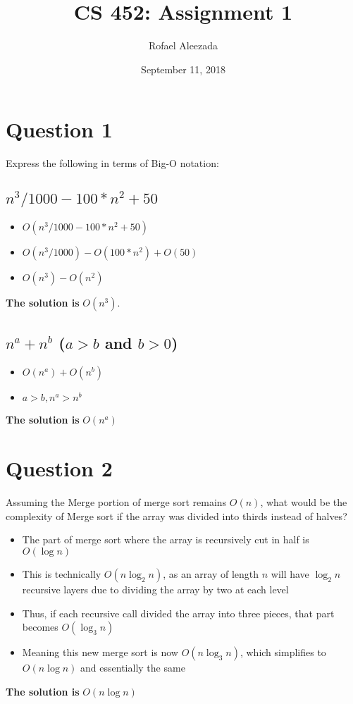 \documentclass{article}
\title{CS 452: Assignment 1}
\date{September 11, 2018}
\author{Rofael Aleezada}
\begin{document}
    \maketitle

    \section{Question 1}
    Express the following in terms of Big-O notation:
        \subsection{$n^3/1000 - 100 * n^2 + 50$}
        	\begin{itemize}
        		\item{$O(n^3 / 1000 - 100 * n^2 + 50)$}
        		\item{$O(n^3 / 1000) - O(100*n^2) + O(50)$}
        		\item{$O(n^3) - O(n^2)$}
        	\end{itemize}
        \textbf{The solution is} $O(n^3)$.

        \subsection{$n^a + n^b$ ($a > b$ and $b > 0$)}
        	\begin{itemize}
        		\item{$O(n^a) + O(n^b)$}
        		\item{$a > b, n^a > n^b$}
        	\end{itemize}
        \textbf{The solution is} $O(n^a)$

    \section{Question 2}
    Assuming the Merge portion of merge sort remains $O(n)$, what would be the complexity of Merge sort if the array was divided into thirds instead of halves?
        \begin{itemize}
            \item{The part of merge sort where the array is recursively cut in half is $O(\log n)$}
            \item{This is technically $O(n\log_2 n)$, as an array of length $n$ will have $\log_2 n$ recursive layers due to dividing the array by two at each level}
            \item{Thus, if each recursive call divided the array into three pieces, that part becomes $O(\log_3 n)$}
            \item{Meaning this new merge sort is now $O(n\log_3 n)$, which simplifies to $O(n\log n)$ and essentially the same}
        \end{itemize}
    \textbf{The solution is} $O(n\log n)$
\end{document}
